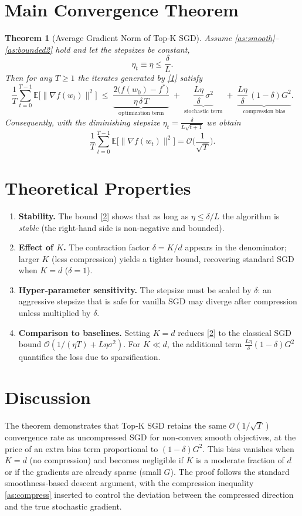 \documentclass{article}
\newtheorem{theorem}{Theorem}
\newcommand{\E}{\mathbb{E}}
\begin{document}
\section*{Main Convergence Theorem}
\begin{theorem}[Average Gradient Norm of Top‑K SGD]\label{thm:main}
Assume \ref{as:smooth}–\ref{as:bounded2} hold and let the stepsizes be constant,
\[
\eta_{t}\equiv \eta\le \frac{\delta}{L}.
\]
Then for any $T\ge1$ the iterates generated by \eqref{1} satisfy
\[
\frac{1}{T}\sum_{t=0}^{T-1}\E\!\big[\|\nabla f(w_{t})\|^{2}\big]
\;\le\;
\underbrace{\frac{2\big(f(w_{0})-f^{*}\big)}{\eta\,\delta\,T}}_{\text{optimization term}}
\;+\;
\underbrace{ \frac{L\eta}{\delta}\,\sigma^{2}}_{\text{stochastic term}}
\;+\;
\underbrace{ \frac{L\eta}{\delta}\,(1-\delta)G^{2}}_{\text{compression bias}} .
\tag{2}
\]
Consequently, with the diminishing stepsize $\eta_{t}= \frac{\delta}{L\sqrt{t+1}}$ we obtain
\[
\frac{1}{T}\sum_{t=0}^{T-1}\E\!\big[\|\nabla f(w_{t})\|^{2}\big]=
\mathcal{O}\!\Big(\frac{1}{\sqrt{T}}\Big).
\]
\end{theorem}

\section*{Theoretical Properties}
\begin{enumerate}[label=\arabic*)]
\item \textbf{Stability.} The bound \eqref{2} shows that as long as $\eta\le\delta/L$ the algorithm is \emph{stable} (the right‑hand side is non‑negative and bounded).
\item \textbf{Effect of $K$.} The contraction factor $\delta=K/d$ appears in the denominator; larger $K$ (less compression) yields a tighter bound, recovering standard SGD when $K=d$ ($\delta=1$).
\item \textbf{Hyper‑parameter sensitivity.} The stepsize must be scaled by $\delta$: an aggressive stepsize that is safe for vanilla SGD may diverge after compression unless multiplied by $\delta$.
\item \textbf{Comparison to baselines.} Setting $K=d$ reduces \eqref{2} to the classical SGD bound $\mathcal{O}(1/(\eta T)+L\eta\sigma^{2})$. For $K\ll d$, the additional term $\frac{L\eta}{\delta}(1-\delta)G^{2}$ quantifies the loss due to sparsification.
\end{enumerate}

\section*{Discussion}
The theorem demonstrates that Top‑K SGD retains the same $\mathcal{O}(1/\sqrt{T})$ convergence rate as uncompressed SGD for non‑convex smooth objectives, at the price of an extra bias term proportional to $(1-\delta)G^{2}$. This bias vanishes when $K=d$ (no compression) and becomes negligible if $K$ is a moderate fraction of $d$ or if the gradients are already sparse (small $G$). The proof follows the standard smoothness‑based descent argument, with the compression inequality \ref{as:compress} inserted to control the deviation between the compressed direction and the true stochastic gradient.
\end{document}
